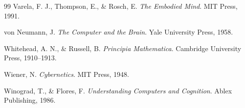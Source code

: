 \documentclass[12pt,oneside]{article}
\theoremstyle{remark}
\begin{document}
\begin{thebibliography}{99}
Varela, F. J., Thompson, E., \& Rosch, E.
\newblock \emph{The Embodied Mind}.
\newblock MIT Press, 1991.

von Neumann, J.
\newblock \emph{The Computer and the Brain}.
\newblock Yale University Press, 1958.

Whitehead, A. N., \& Russell, B.
\newblock \emph{Principia Mathematica}.
\newblock Cambridge University Press, 1910--1913.

Wiener, N.
\newblock \emph{Cybernetics}.
\newblock MIT Press, 1948.

Winograd, T., \& Flores, F.
\newblock \emph{Understanding Computers and Cognition}.
\newblock Ablex Publishing, 1986.

\end{thebibliography}
\end{document}
